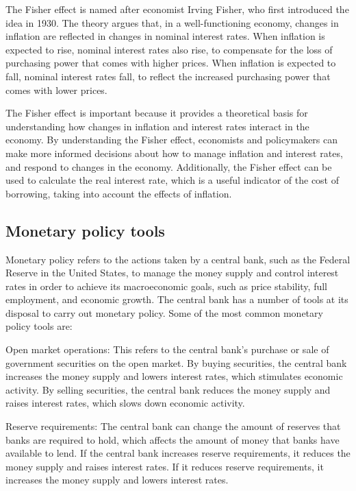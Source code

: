 \documentclass[12pt, a4paper, oneside]{article}
\begin{document}
The Fisher effect is named after economist Irving Fisher, who first introduced the idea in 1930. The theory argues that, in a well-functioning economy, changes in inflation are reflected in changes in nominal interest rates. When inflation is expected to rise, nominal interest rates also rise, to compensate for the loss of purchasing power that comes with higher prices. When inflation is expected to fall, nominal interest rates fall, to reflect the increased purchasing power that comes with lower prices.

The Fisher effect is important because it provides a theoretical basis for understanding how changes in inflation and interest rates interact in the economy. By understanding the Fisher effect, economists and policymakers can make more informed decisions about how to manage inflation and interest rates, and respond to changes in the economy. Additionally, the Fisher effect can be used to calculate the real interest rate, which is a useful indicator of the cost of borrowing, taking into account the effects of inflation.




\subsection{ Monetary policy tools }
Monetary policy refers to the actions taken by a central bank, such as the Federal Reserve in the United States, to manage the money supply and control interest rates in order to achieve its macroeconomic goals, such as price stability, full employment, and economic growth. The central bank has a number of tools at its disposal to carry out monetary policy. Some of the most common monetary policy tools are:

Open market operations: This refers to the central bank's purchase or sale of government securities on the open market. By buying securities, the central bank increases the money supply and lowers interest rates, which stimulates economic activity. By selling securities, the central bank reduces the money supply and raises interest rates, which slows down economic activity.

Reserve requirements: The central bank can change the amount of reserves that banks are required to hold, which affects the amount of money that banks have available to lend. If the central bank increases reserve requirements, it reduces the money supply and raises interest rates. If it reduces reserve requirements, it increases the money supply and lowers interest rates.
\end{document}
